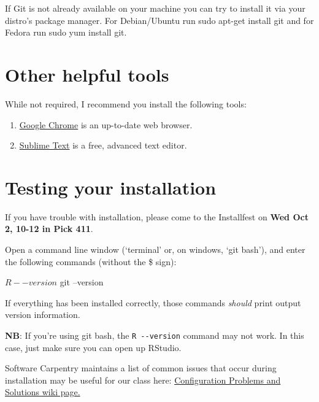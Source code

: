 \documentclass[]{book}
\newenvironment{Shaded}{\begin{snugshade}}{\end{snugshade}}
\newcommand{\FunctionTok}[1]{\textcolor[rgb]{0.00,0.00,0.00}{#1}}
\newcommand{\ExtensionTok}[1]{#1}
\newcommand{\NormalTok}[1]{#1}
\begin{document}
If Git is not already available on your machine you can try to install
it via your distro's package manager. For Debian/Ubuntu run sudo apt-get
install git and for Fedora run sudo yum install git.

\section{Other helpful tools}\label{other-helpful-tools}

While not required, I recommend you install the following tools:

\begin{enumerate}
\def\labelenumi{\arabic{enumi}.}
\item
  \href{https://www.google.com/chrome/}{Google Chrome} is an up-to-date
  web browser.
\item
  \href{https://www.sublimetext.com/3}{Sublime Text} is a free, advanced
  text editor.
\end{enumerate}

\section{Testing your installation}\label{testing-your-installation}

If you have trouble with installation, please come to the Installfest on
\textbf{Wed Oct 2, 10-12 in Pick 411}.

Open a command line window (`terminal' or, on windows, `git bash'), and
enter the following commands (without the \$ sign):

\begin{Shaded}
\begin{Highlighting}[]
\NormalTok{$ }\ExtensionTok{R}\NormalTok{ --version}
\NormalTok{$ }\FunctionTok{git}\NormalTok{ --version}
\end{Highlighting}
\end{Shaded}

If everything has been installed correctly, those commands \emph{should}
print output version information.

\textbf{NB}: If you're using git bash, the \texttt{R\ -\/-version}
command may not work. In this case, just make sure you can open up
RStudio.

Software Carpentry maintains a list of common issues that occur during
installation may be useful for our class here:
\href{https://github.com/swcarpentry/workshop-template/wiki/Configuration-Problems-and-Solutions}{Configuration
Problems and Solutions wiki page.}
\end{document}
